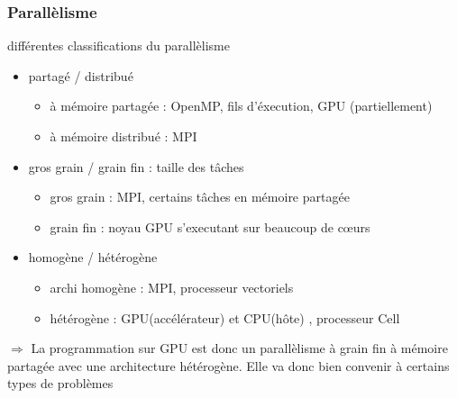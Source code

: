 \documentclass[11pt,mathserif]{beamer}
\begin{document}
\begin{frame}
\frametitle{Parallèlisme}
\pause
différentes classifications du parallèlisme
\begin{itemize}[<+->]
  \item partagé / distribué
    \begin{itemize}
      \item à mémoire partagée : OpenMP, fils d'éxecution, GPU (partiellement)
      \item à mémoire distribué : MPI
    \end{itemize}
 \item gros grain / grain fin : taille des tâches
   \begin{itemize}
     \item gros grain : MPI, certains tâches en mémoire partagée
     \item grain fin : noyau GPU s'executant sur beaucoup de cœurs
   \end{itemize}
 \item homogène / hétérogène 
   \begin{itemize}
     \item archi homogène : MPI, processeur vectoriels
     \item hétérogène : GPU(accélérateur) et CPU(hôte) , processeur Cell 
   \end{itemize}
\end{itemize}
\pause
$\Rightarrow$ La programmation sur GPU est donc un parallèlisme à grain fin à mémoire partagée avec une architecture hétérogène. Elle va
donc bien convenir à certains types de problèmes
\end{frame}
\end{document}
